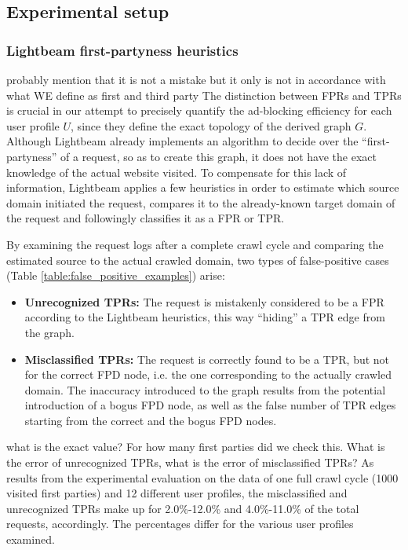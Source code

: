 \documentclass{sig-alternate}
\begin{document}
\subsection{Experimental setup}

\subsubsection{Lightbeam first-partyness heuristics}
{\color{blue}probably mention that it is not a mistake but it only is not in accordance with what WE define as first and third party}
The distinction between FPRs and TPRs is crucial in our attempt to precisely quantify the ad-blocking efficiency for each user profile $U$, since they define the exact topology of the derived graph $G$. Although Lightbeam already implements an algorithm to decide over the ``first-partyness'' of a request, so as to create this graph, it does not have the exact knowledge of the actual website visited. To compensate for this lack of information, Lightbeam applies a few heuristics in order to estimate which source domain initiated the request, compares it to the already-known target domain of the request and followingly classifies it as a FPR or TPR.

By examining the request logs after a complete crawl cycle and comparing the estimated source to the actual crawled domain, two types of false-positive cases (Table \ref{table:false_positive_examples}) arise:

\begin{itemize}
\item \textbf{Unrecognized TPRs:} The request is mistakenly considered to be a FPR according to the Lightbeam heuristics, this way ``hiding'' a TPR edge from the graph.
\item \textbf{Misclassified TPRs:} The request is correctly found to be a TPR, but not for the correct FPD node, i.e. the one corresponding to the actually crawled domain. The inaccuracy introduced to the graph results from the potential introduction of a bogus FPD node, as well as the false number of TPR edges starting from the correct and the bogus FPD nodes.
\end{itemize}

{\color{red}what is the exact value? For how many first parties did we check this. What is the error of unrecognized TPRs, what is the error of misclassified TPRs?}
{\color{blue}
As results from the experimental evaluation on the data of one full crawl cycle (1000 visited first parties) and 12 different user profiles, the misclassified and unrecognized TPRs make up for 2.0\%-12.0\% and 4.0\%-11.0\% of the total requests, accordingly. The percentages differ for the various user profiles examined.}
\end{document}
